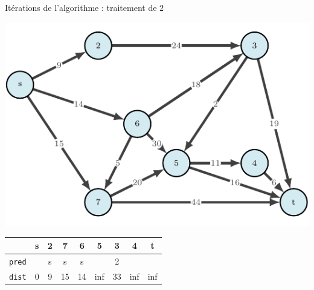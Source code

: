 \begin{frame}{Itérations de l'algorithme : traitement de $2$}
    \begin{center}
        \includegraphics[height=.6\textheight]{fig/dijkstra-0.pdf}      
    \begin{tabular}{c|cccccccc}
      
        & \textbf{s}   &\textbf{2}     &7      &6      &5      &3      &4      &t      \\
        \hline
        \texttt{pred} & &s      &s      &s      &       &2      &       &       \\
        \texttt{dist} & 0       &9      &15     &14     &inf    &33     &inf    &inf    \\
                   \end{tabular}
\end{center}
\end{frame}

